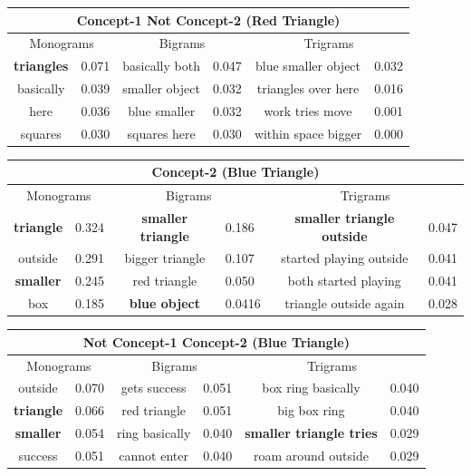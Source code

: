 \def\DevnagVersion{2.15}\documentclass[a4paper, 11pt, notitlepage]{report}
\begin{document}
\begin{center}
\begin{tabular}{||c|l||c|l||c|l||}
\hline
\multicolumn{6}{||c||}{\bf Concept-1 Not Concept-2 (Red Triangle) }\\
\hline
\multicolumn{2}{||c||}{Monograms } &\multicolumn{2}{|c||}{Bigrams} &\multicolumn{2}{|c||}{Trigrams} \\
\hline
{\bf triangles }& 0.071 & basically both & 0.047 & blue smaller object & 0.032\\
basically & 0.039 & smaller object & 0.032  & triangles over here & 0.016\\
here  & 0.036 &blue smaller & 0.032 & work tries move & 0.001\\
squares & 0.030 & squares here & 0.030 & within space bigger & 0.000\\
\hline
\end{tabular}
\end{center}



\begin{center}
\begin{tabular}{||c|l||c|l||c|l||}
\hline
\multicolumn{6}{||c||}{\bf Concept-2 (Blue Triangle) }\\
\hline
\multicolumn{2}{||c||}{Monograms } &\multicolumn{2}{|c||}{Bigrams} &\multicolumn{2}{|c||}{Trigrams} \\
\hline
{\bf triangle} & 0.324 & {\bf smaller triangle} & 0.186 & {\bf smaller triangle outside} & 0.047 \\
outside & 0.291 &bigger triangle & 0.107 & started playing outside & 0.041\\
{\bf smaller}  & 0.245 &red triangle & 0.050 & both started playing & 0.041\\
box & 0.185 & {\bf blue object} & 0.0416 & triangle outside again & 0.028\\
\hline
\end{tabular}
\end{center}

\begin{center}
\begin{tabular}{||c|l||c|l||c|l||}
\hline
\multicolumn{6}{||c||}{\bf Not Concept-1 Concept-2 (Blue Triangle) }\\
\hline
\multicolumn{2}{||c||}{Monograms } &\multicolumn{2}{|c||}{Bigrams} &\multicolumn{2}{|c||}{Trigrams} \\
\hline
outside  & 0.070 & gets success & 0.051 & box ring basically & 0.040 \\
{\bf triangle} & 0.066 &red triangle & 0.051 & big box ring & 0.040\\
{\bf smaller}& 0.054 &ring basically & 0.040 &{\bf smaller triangle tries} & 0.029\\
success & 0.051 & cannot enter & 0.040 & roam around outside & 0.029\\
\hline
\end{tabular}
\end{center}
\end{document}
